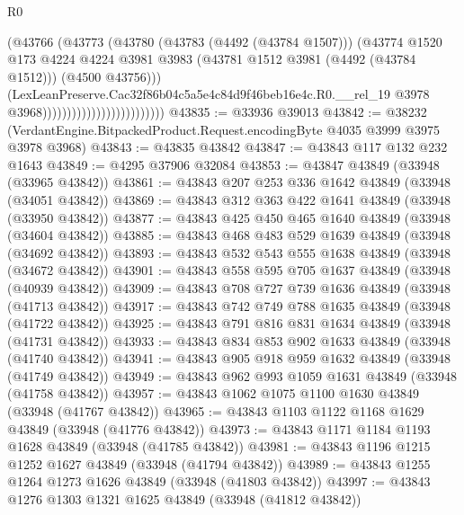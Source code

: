 \begin{lexlean}{R0}
\begin{coremodule}
                                                (@43766
                                                  (@43773
                                                    (@43780
                                                      (@43783 (@4492 (@43784 @1507)))
                                                      (@43774
                                                        @1520
                                                        @173
                                                        @4224
                                                        @4224
                                                        @3981
                                                        @3983
                                                        (@43781 @1512 @3981 (@4492 (@43784 @1512)))
                                                        (@4500 @43756)))
                                                    (LexLeanPreserve.Cac32f86b04c5a5e4c84d9f46beb16e4c.R0.__rel_19
                                                      @3978
                                                      @3968)))))))))))))))))))))))))
@43835 := @33936 @39013
@43842 := @38232 (VerdantEngine.BitpackedProduct.Request.encodingByte @4035 @3999 @3975 @3978 @3968)
@43843 := @43835 @43842
@43847 := @43843 @117 @132 @232 @1643
@43849 := @4295 @37906 @32084
@43853 := @43847 @43849 (@33948 (@33965 @43842))
@43861 := @43843 @207 @253 @336 @1642 @43849 (@33948 (@34051 @43842))
@43869 := @43843 @312 @363 @422 @1641 @43849 (@33948 (@33950 @43842))
@43877 := @43843 @425 @450 @465 @1640 @43849 (@33948 (@34604 @43842))
@43885 := @43843 @468 @483 @529 @1639 @43849 (@33948 (@34692 @43842))
@43893 := @43843 @532 @543 @555 @1638 @43849 (@33948 (@34672 @43842))
@43901 := @43843 @558 @595 @705 @1637 @43849 (@33948 (@40939 @43842))
@43909 := @43843 @708 @727 @739 @1636 @43849 (@33948 (@41713 @43842))
@43917 := @43843 @742 @749 @788 @1635 @43849 (@33948 (@41722 @43842))
@43925 := @43843 @791 @816 @831 @1634 @43849 (@33948 (@41731 @43842))
@43933 := @43843 @834 @853 @902 @1633 @43849 (@33948 (@41740 @43842))
@43941 := @43843 @905 @918 @959 @1632 @43849 (@33948 (@41749 @43842))
@43949 := @43843 @962 @993 @1059 @1631 @43849 (@33948 (@41758 @43842))
@43957 := @43843 @1062 @1075 @1100 @1630 @43849 (@33948 (@41767 @43842))
@43965 := @43843 @1103 @1122 @1168 @1629 @43849 (@33948 (@41776 @43842))
@43973 := @43843 @1171 @1184 @1193 @1628 @43849 (@33948 (@41785 @43842))
@43981 := @43843 @1196 @1215 @1252 @1627 @43849 (@33948 (@41794 @43842))
@43989 := @43843 @1255 @1264 @1273 @1626 @43849 (@33948 (@41803 @43842))
@43997 := @43843 @1276 @1303 @1321 @1625 @43849 (@33948 (@41812 @43842))

\end{coremodule}
\end{lexlean}
